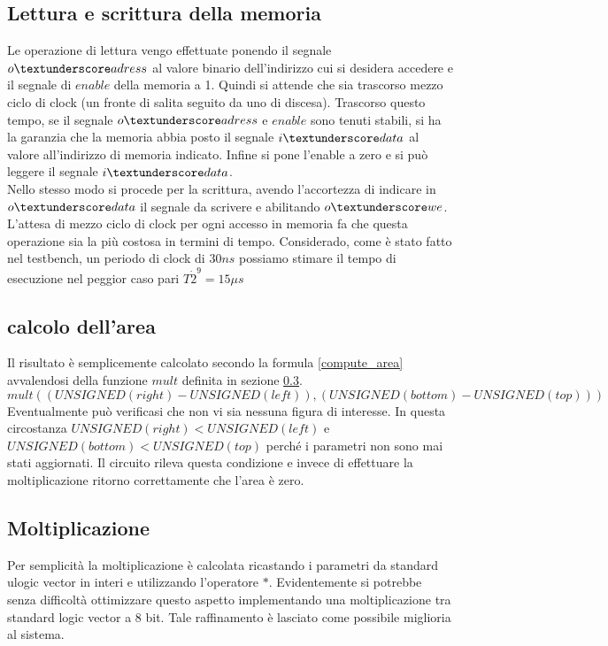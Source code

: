 \subsection{Lettura e scrittura della memoria}
Le operazione di lettura vengo effettuate ponendo il segnale $o \textunderscore adress$ al valore binario dell'indirizzo cui si desidera accedere e il segnale di $enable$ della memoria a 1. Quindi si attende che sia trascorso mezzo ciclo di clock (un fronte di salita seguito da uno di discesa). Trascorso questo tempo, se il segnale $o \textunderscore adress$ e $enable$ sono tenuti stabili, si ha la garanzia che la memoria abbia posto il segnale $i \textunderscore data$ al valore all'indirizzo di memoria indicato. Infine si pone l'enable a zero e si può leggere il segnale $i \textunderscore data$.\\
Nello stesso modo si procede per la scrittura, avendo l'accortezza di indicare in $o \textunderscore data$ il segnale da scrivere e abilitando $o \textunderscore we$. \\
L'attesa di mezzo ciclo di clock per ogni accesso in memoria fa che questa operazione sia la più costosa in termini di tempo. Considerado, come è stato fatto nel testbench, un periodo di clock di $30 ns$ possiamo stimare il tempo di esecuzione nel peggior caso pari $T \dot 2^9 = 15 \mu s$ 

\subsection{calcolo dell'area}
Il risultato è semplicemente calcolato secondo la formula \ref{compute_area} avvalendosi della funzione $mult$ definita in sezione \ref{mult}.
\begin{equation}
	mult((UNSIGNED(right) - UNSIGNED(left)),  (UNSIGNED(bottom) - UNSIGNED(top)))
    \label{compute_area}
\end{equation}
Eventualmente può verificasi che non vi sia nessuna figura di interesse. In questa circostanza $UNSIGNED(right) < UNSIGNED(left)$ e $UNSIGNED(bottom) < UNSIGNED(top)$ perché i parametri non sono mai stati aggiornati. Il circuito rileva questa condizione e invece di effettuare la moltiplicazione ritorno correttamente che l'area è zero.

\subsection{Moltiplicazione}
\label{mult}
Per semplicità la moltiplicazione è calcolata ricastando i parametri da standard ulogic vector in interi e utilizzando l'operatore $*$. Evidentemente si potrebbe senza difficoltà ottimizzare questo aspetto implementando una moltiplicazione tra standard logic vector a 8 bit. Tale raffinamento è lasciato come possibile miglioria al sistema. 



